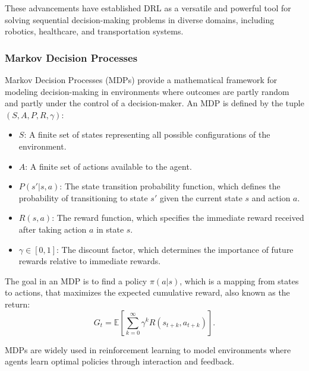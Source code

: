 \documentclass[runningheads]{llncs}
\begin{document}
These advancements have established DRL as a versatile and powerful tool for solving sequential decision-making problems in diverse domains, including robotics, healthcare, and transportation systems.
\subsubsection{Markov Decision Processes}
Markov Decision Processes (MDPs) provide a mathematical framework for modeling decision-making in environments where outcomes are partly random and partly under the control of a decision-maker. An MDP is defined by the tuple $(S, A, P, R, \gamma)$:

\begin{itemize}
    \item $S$: A finite set of states representing all possible configurations of the environment.
    \item $A$: A finite set of actions available to the agent.
    \item $P(s'|s, a)$: The state transition probability function, which defines the probability of transitioning to state $s'$ given the current state $s$ and action $a$.
    \item $R(s, a)$: The reward function, which specifies the immediate reward received after taking action $a$ in state $s$.
    \item $\gamma \in [0, 1]$: The discount factor, which determines the importance of future rewards relative to immediate rewards.
\end{itemize}

The goal in an MDP is to find a policy $\pi(a|s)$, which is a mapping from states to actions, that maximizes the expected cumulative reward, also known as the return:
\[
G_t = \mathbb{E} \left[ \sum_{k=0}^\infty \gamma^k R(s_{t+k}, a_{t+k}) \right].
\]

MDPs are widely used in reinforcement learning to model environments where agents learn optimal policies through interaction and feedback.
\end{document}
